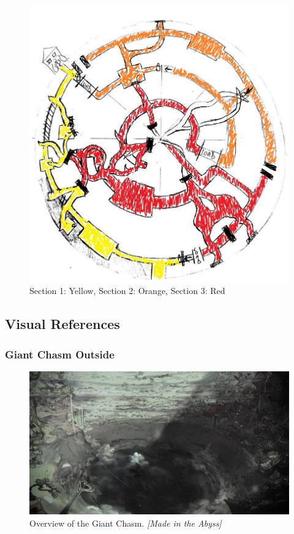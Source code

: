 \begin{figure}[H]
	\centering
	\includegraphics[width=0.8\linewidth]{images/visual_ref/15_giant_chasm/chasm_colored_map.jpg}
	\caption*{Section 1: Yellow, Section 2: Orange, Section 3: Red}
\end{figure}

\subsection{Visual References}

\subsubsection{Giant Chasm Outside}

\begin{figure}[H]
	\centering
	\includegraphics[width=0.8\linewidth]{images/visual_ref/15_giant_chasm/chasm_outside.jpg}
	\caption*{Overview of the Giant Chasm. \textit{[Made in the Abyss]}}
\end{figure}

